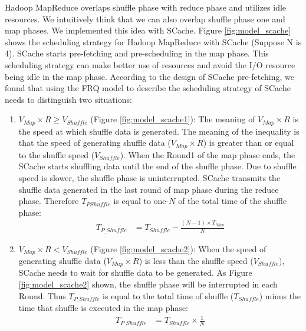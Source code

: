 {Hadoop MapReduce overlaps shuffle phase with reduce phase and utilizes idle resources. We intuitively think that we can also overlap shuffle phase one and map phases. We implemented this idea with SCache.
Figure \ref{fig:model_scache} shows the scheduling strategy for Hadoop MapReduce with SCache (Suppose N is 4). SCache starts pre-fetching and pre-scheduling in the map phase. This scheduling strategy can make better use of resources and avoid the I/O resource being idle in the map phase. According to the design of SCache pre-fetching, we found that using the FRQ model to describe the scheduling strategy of SCache needs to distinguish two situations:

\begin{enumerate}
    \item 
    \(V_{Map} \times R \ge V_{Shuffle}\) (Figure \ref{fig:model_scache1}): 
	The meaning of \(V_{Map} \times R\) is the speed at which shuffle data is generated. The meaning of the inequality is that the speed of generating shuffle data (\(V_{Map} \times R\)) is greater than or equal to the shuffle speed (\(V_{Shuffle}\)). When the Round1 of the map phase ends, the SCache starts shuffling data until the end of the shuffle phase. Due to shuffle speed is slower, the shuffle phase is uninterrupted. SCache transmits the shuffle data generated in the last round of map phase during the reduce phase. Therefore \(T_{PShuffle}\) is equal to one-\(N\) of the total time of the shuffle phase:
	\begin{equation}
		\label{equation_Tpshuffle1}
		\begin{aligned}
			T_{P\_Shuffle} &= T_{Shuffle} - \frac{(N - 1)\times T_{Map}}{N}
		\end{aligned}
	\end{equation}
	
    \item \(V_{Map} \times R < V_{Shuffle}\) (Figure \ref{fig:model_scache2}): 
	When the speed of generating shuffle data (\(V_{Map} \times R\)) is less than the shuffle speed (\(V_{Shuffle}\)), SCache needs to wait for shuffle data to be generated. As Figure \ref{fig:model_scache2} shown, the shuffle phase will be interrupted in each Round. Thus \(T_{P\_Shuffle}\) is equal to the total time of shuffle (\(T_{Shuffle}\)) minus the time that shuffle is executed in the map phase:
	\begin{equation}
		\label{equation_Tpshuffle2}
		\begin{aligned}
			T_{P\_Shuffle} &= T_{Shuffle} \times \frac{1}{N}
		\end{aligned}
	\end{equation}
\end{enumerate}

}
